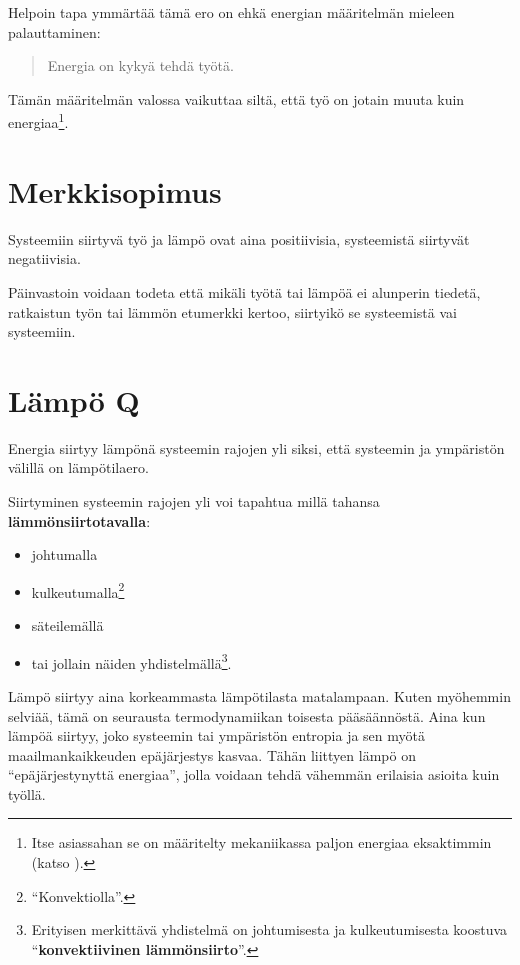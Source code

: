 \documentclass[12pt,a4paper,finnish]{book}
\begin{document}
Helpoin tapa ymmärtää tämä ero on ehkä energian määritelmän mieleen palauttaminen:

\begin{quote}
 Energia on kykyä tehdä työtä.
\end{quote}

Tämän määritelmän valossa vaikuttaa siltä, että työ on jotain muuta kuin energiaa\footnote{Itse asiassahan 
se on määritelty mekaniikassa paljon energiaa eksaktimmin (katso ).}.

\section{Merkkisopimus} \label{sec:merkkisopimus} %

Systeemiin siirtyvä työ ja lämpö ovat aina positiivisia, systeemistä siirtyvät negatiivisia.

Päinvastoin voidaan todeta että mikäli työtä tai lämpöä ei alunperin tiedetä, ratkaistun 
työn tai lämmön etumerkki kertoo, siirtyikö se systeemistä vai systeemiin.

\section{Lämpö Q} %

Energia siirtyy lämpönä systeemin rajojen yli siksi, että systeemin ja ympäristön 
välillä on lämpötilaero. 

Siirtyminen systeemin rajojen yli voi tapahtua millä tahansa \textbf{lämmönsiirtotavalla}:

\begin{itemize}
 \item johtumalla
 \item kulkeutumalla\footnote{``Konvektiolla''.}
 \item säteilemällä
 \item tai jollain näiden 
yhdistelmällä\footnote{Erityisen merkittävä yhdistelmä on johtumisesta ja kulkeutumisesta 
koostuva ``\textbf{konvektiivinen lämmönsiirto}''.}.
\end{itemize}

Lämpö siirtyy aina korkeammasta lämpötilasta matalampaan. Kuten myöhemmin selviää, tämä 
on seurausta termodynamiikan toisesta pääsäännöstä. Aina kun lämpöä siirtyy, joko systeemin tai 
ympäristön entropia ja sen myötä maailmankaikkeuden epäjärjestys kasvaa.
Tähän liittyen lämpö on ``epäjärjestynyttä energiaa'', jolla voidaan tehdä vähemmän 
erilaisia asioita kuin työllä.
\end{document}
